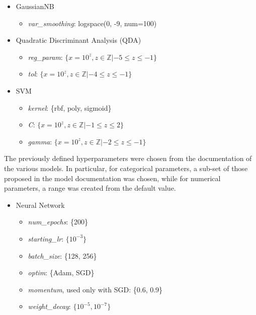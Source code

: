 \documentclass[../main]{subfiles}
\begin{document}
\begin{itemize}
    \item GaussianNB
    \begin{itemize}
        \item \textit{var\_smoothing}: logspace(0, -9, num=100)
    \end{itemize}
    \item Quadratic Discriminant Analysis (QDA)
    \begin{itemize}
        \item \textit{reg\_param}: $\{x = 10^z, z \in \mathbb{Z}|-5 \leq z \leq -1\}$
        \item \textit{tol}: $\{x = 10^z, z \in \mathbb{Z}|-4 \leq z \leq -1\}$
    \end{itemize}
\end{itemize}

\begin{itemize}
    \item SVM
    \begin{itemize}
        \item \textit{kernel}: \{rbf, poly, sigmoid\}
        \item \textit{C}: $\{x = 10^z, z \in \mathbb{Z}|-1 \leq z \leq 2\}$
        \item \textit{gamma}: $\{x = 10^z, z \in \mathbb{Z}|-2 \leq z \leq -1\}$
    \end{itemize}
\end{itemize}
The previously defined hyperparameters were chosen from the documentation of the various models.
In particular, for categorical parameters, a sub-set of those proposed in the model documentation was chosen, while for numerical parameters, a range was created from the default value.
\begin{itemize}
    \item Neural Network
    \begin{itemize}
        \item \textit{num\_epochs}: \{200\}
        \item \textit{starting\_lr}: $\{10^{-3}\}$
        \item \textit{batch\_size}: \{128, 256\}
        \item \textit{optim}: \{Adam, SGD\}
        \item \textit{momentum}, used only with SGD: \{0.6, 0.9\}
        \item \textit{weight\_decay}: $\{10^{-5}, 10^{-7}\}$
    \end{itemize}
\end{itemize}
\end{document}
